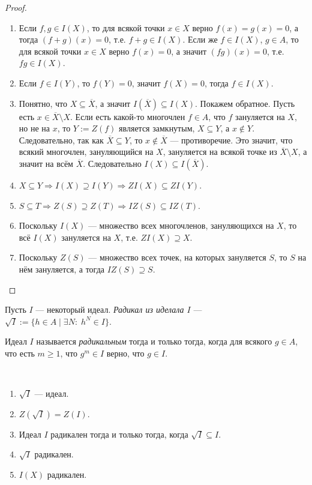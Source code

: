 \documentclass[12pt,a4paper]{article}
\begin{document}
    \begin{proof}
        \begin{enumerate}
            \item Если $f, g \in I(X)$, то для всякой точки $x \in X$ верно $f(x) = g(x) = 0$, а тогда $(f+g)(x) = 0$, т.е. $f+g \in I(X)$. Если же $f \in I(X)$, $g \in A$, то для всякой точки $x \in X$ верно $f(x) = 0$, а значит $(fg)(x) = 0$, т.е. $fg \in I(X)$.
            \item Если $f \in I(Y)$, то $f(Y) = 0$, значит $f(X) = 0$, тогда $f \in I(X)$.
            \item Понятно, что $X \subseteq \overline{X}$, а значит $I(\overline{X}) \subseteq I(X)$. Покажем обратное. Пусть есть $x \in \overline{X} \setminus X$. Если есть какой-то многочлен $f \in A$, что $f$ зануляется на $X$, но не на $x$, то $Y := Z(f)$ является замкнутым, $X \subseteq Y$, а $x \notin Y$. Следовательно, так как $\overline{X} \subseteq Y$, то $x \notin \overline{X}$ --- противоречие. Это значит, что всякий многочлен, зануляющийся на $X$, зануляется на всякой точке из $\overline{X} \setminus X$, а значит на всём $\overline{X}$. Следовательно $I(X) \subseteq I(\overline{X})$.
            \item $X \subseteq Y \Rightarrow I(X) \supseteq I(Y) \Rightarrow ZI(X) \subseteq ZI(Y)$.
            \item $S \subseteq T \Rightarrow Z(S) \supseteq Z(T) \Rightarrow IZ(S) \subseteq IZ(T)$.
            \item Поскольку $I(X)$ --- множество всех многочленов, зануляющихся на $X$, то всё $I(X)$ зануляется на $X$, т.е. $ZI(X) \supseteq X$. 
            \item Поскольку $Z(S)$ --- множество всех точек, на которых зануляется $S$, то $S$ на нём зануляется, а тогда $IZ(S) \supseteq S$.
        \end{enumerate}
    \end{proof}

    \begin{definition}
        Пусть $I$ --- некоторый идеал. \emph{Радикал из иделала $I$} --- $\sqrt{I} := \{h \in A \mid \exists N \colon \; h^N \in I\}$.

        Идеал $I$ называется \emph{радикальным} тогда и только тогда, когда для всякого $g \in A$, что есть $m \geqslant 1$, что $g^m \in I$ верно, что $g \in I$.
    \end{definition}

    \begin{lemma}\ 
        \begin{enumerate}
            \item $\sqrt{I}$ --- идеал.
            \item $Z(\sqrt{I}) = Z(I)$.
            \item Идеал $I$ радикален тогда и только тогда, когда $\sqrt{I} \subseteq I$.
            \item $\sqrt{I}$ радикален.
            \item $I(X)$ радикален.
        \end{enumerate}
    \end{lemma}
\end{document}
